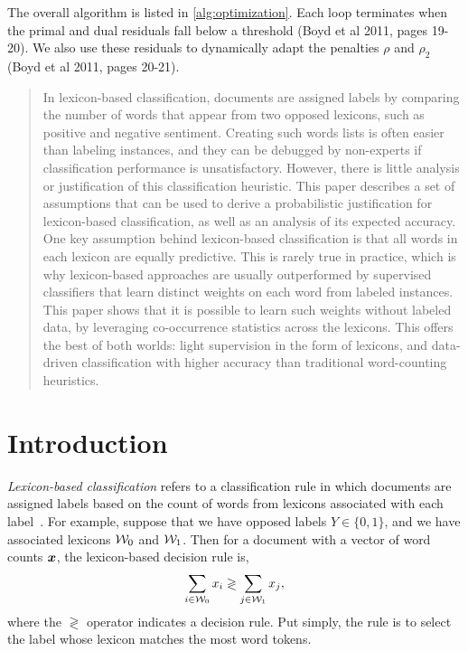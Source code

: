 The overall algorithm is listed in \autoref{alg:optimization}. Each loop terminates when the primal and dual residuals fall below a threshold (Boyd et al 2011, pages 19-20). We also use these residuals to dynamically adapt the penalties $\rho$ and $\rho_2$ (Boyd et al 2011, pages 20-21).

\begin{abstract}
In lexicon-based classification, documents are assigned labels by  comparing the number of words that appear from two opposed lexicons, such as positive and negative sentiment. Creating such words lists is often easier than labeling instances, and they can be debugged by non-experts if classification performance is unsatisfactory. However, there is little analysis or justification of this classification heuristic. This paper describes a set of assumptions that can be used to derive a probabilistic justification for lexicon-based classification, as well as an analysis of its expected accuracy. One key assumption behind lexicon-based classification is that all words in each lexicon are equally predictive. This is rarely true in practice, which is why lexicon-based approaches are usually outperformed by supervised classifiers that learn distinct weights on each word from labeled instances. This paper shows that it is possible to learn such weights without labeled data, by leveraging co-occurrence statistics across the lexicons. This offers the best of both worlds: light supervision in the form of lexicons, and data-driven classification with higher accuracy than traditional word-counting heuristics.
\end{abstract}

\section{Introduction}
\emph{Lexicon-based classification} refers to a classification rule in which documents are assigned labels based on the count of words from lexicons associated with each label~\cite{taboada2011lexicon}. For example, suppose that we have opposed labels $Y \in \{0,1\}$, and we have associated lexicons $\mathcal{W}_0$ and $\mathcal{W}_1$. Then for a document with a vector of word counts $\bm{x}$, the lexicon-based decision rule is,
\begin{dmath}
\label{eq:lexicon-decision-rule}
\sum_{i \in \lex_0} x_i \gtrless \sum_{j \in \lex_1} x_j,
\end{dmath}
where the $\gtrless$ operator indicates a decision rule. Put simply, the rule is to select the label whose lexicon matches the most word tokens.

